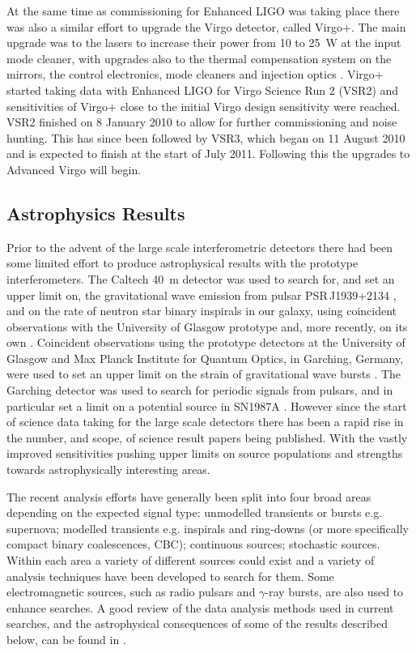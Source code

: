 \documentclass{article}
\begin{document}
At the same time as commissioning for Enhanced LIGO was taking place there
was also a similar effort to upgrade the Virgo detector, called Virgo+.
The main upgrade was to the lasers to increase their power from 10 to 25~W at
the input mode cleaner, with upgrades also to the thermal compensation system
on the mirrors, the control electronics, mode cleaners and injection optics
\cite{Acernese:2008b, AdVwhitepaper}. Virgo+ started taking data with
Enhanced LIGO for Virgo Science Run 2 (VSR2) and sensitivities of Virgo+ close to
the initial Virgo design sensitivity were reached. VSR2 finished on 8 January 2010
to allow for further commissioning and noise hunting. This has since been followed
by VSR3, which began on 11 August 2010 and is expected to finish at the start of
July 2011. Following this the upgrades to Advanced Virgo will begin.

\subsection{Astrophysics Results}\label{subsection:results}
Prior to the advent of the large scale interferometric detectors there had
been some limited effort to produce astrophysical results with the prototype
interferometers. The Caltech 40~m detector was used to search for, and set an
upper limit on, the gravitational wave emission from pulsar PSR\,J1939+2134
\cite{Hereld:1984}, and on the rate of neutron star binary
inspirals in our galaxy, using coincident observations with the University of
Glasgow prototype \cite{Smith:1988} and, more recently, on its own
\cite{Allen:1999}. Coincident observations using the prototype detectors at the
University of Glasgow and Max Planck Institute for Quantum Optics, in Garching,
Germany, were used to set an upper limit on the strain of gravitational wave
bursts \cite{Nicholson:1996}. The Garching detector was used to search for
periodic signals from pulsars, and in particular set a limit on a potential
source in SN1987A \cite{Niebauer:1993}. However since the start of science data
taking for the large scale detectors there has been a rapid rise in the number,
and scope, of science result papers being published. With the vastly improved
sensitivities pushing upper limits on source populations and strengths towards
astrophysically interesting areas.

The recent analysis efforts have generally been split into four broad areas
depending on the expected signal type: unmodelled transients or bursts e.g. supernova;
modelled transients e.g. inspirals and ring-downs (or more specifically compact
binary coalescences, CBC); continuous sources;
stochastic sources. Within each area a variety of different sources could
exist and a variety of analysis techniques have been developed to search for
them. Some electromagnetic sources, such as radio pulsars and $\gamma$-ray
bursts, are also used to enhance searches. A good review of the data analysis 
methods used in current searches, and the astrophysical consequences of some of
the results described below, can be found in \cite{Sathyaprakash:2009}.
\end{document}
